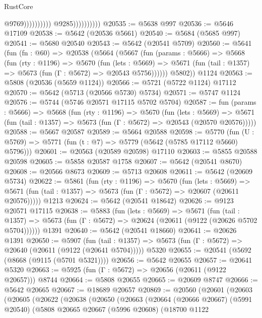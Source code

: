 \begin{lexlean}{RustCore}
\begin{coremodule}
                                            @9769))))))))))
                        @9285))))))))))
@20535 := @5638 @997
@20536 := @5646 @17109
@20538 := @5642 (@20536 @5661)
@20540 := @5684 (@5685 @997)
@20541 := @5680 @20540
@20543 := @5642 (@20541 @5709)
@20560 := @5641
    (fun (fn : @60) =>
    @20538
      (@5664
        (@5667
          (fun (params : @5666) =>
          @5668
            (fun (rty : @1196) =>
            @5670
              (fun (lets : @5669) =>
              @5671 (fun (tail : @1357) => @5673 (fun (Γ : @5672) => @20543 @5756))))))
        @5802))
    @1124
@20563 := @5808 (@20536 (@5659 @1124))
@20566 := @5721 (@5722 @1124) @17112
@20570 := @5642 (@5713 (@20566 @5730) @5734)
@20571 := @5747 @1124
@20576 := @5744 (@5746 @20571 @17115 @5702 @5704)
@20587 := fun (params : @5666) =>
  @5668
    (fun (rty : @1196) =>
    @5670
      (fun (lets : @5669) =>
      @5671 (fun (tail : @1357) => @5673 (fun (Γ : @5672) => @20543 (@20570 @20576)))))
@20588 := @5667 @20587
@20589 := @5664 @20588
@20598 := @5770
    (fun (U : @5769) => @5771 (fun (t : @7) => @5779 (@5642 (@5785 @17112 @5660) @5796)))
@20601 := @20563 (@20589 @20598) @17110
@20603 := @5855 @20588 @20598
@20605 := @5858 @20587 @1758
@20607 := @5642 (@20541 @8670)
@20608 := @20566 @8673
@20609 := @5713 @20608
@20611 := @5642 (@20609 @5734)
@20622 := @5861
    (fun (rty : @1196) =>
    @5670
      (fun (lets : @5669) =>
      @5671 (fun (tail : @1357) => @5673 (fun (Γ : @5672) => @20607 (@20611 @20576)))))
    @1213
@20624 := @5642 (@20541 @18642)
@20626 := @9123 @20571 @17115
@20638 := @5883
    (fun (lets : @5669) =>
    @5671
      (fun (tail : @1357) =>
      @5673 (fun (Γ : @5672) => @20624 (@20611 (@9122 (@20626 @5702 @5704))))))
    @1391
@20640 := @5642 (@20541 @18660)
@20641 := @20626 @1391
@20650 := @5907
    (fun (tail : @1357) => @5673 (fun (Γ : @5672) => @20640 (@20611 (@9122 (@20641 @5704)))))
    @5320
@20655 := @20541 (@5692 (@8668 (@9115 (@5701 @5321))))
@20656 := @5642 @20655
@20657 := @20641 @5320
@20663 := @5925 (fun (Γ : @5672) => @20656 (@20611 (@9122 @20657))) @8744
@20664 := @5808 @20655
@20665 := @20609 @8747
@20666 := @5642 @20665
@20667 := @18689 @20657
@20869 := @20560
    (@20601
      (@20603
        (@20605
          (@20622
            (@20638
              (@20650
                (@20663
                  (@20664
                    (@20666 @20667)
                    (@5991 @20540)
                    (@5808
                      @20665
                      @20667
                      (@5996 @20608)
                      (@18700
                        @1122

\end{coremodule}
\end{lexlean}
